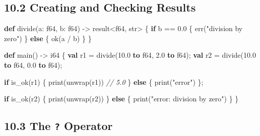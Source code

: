 \documentclass[
  english,
]{book}
\newenvironment{Shaded}{\begin{snugshade}}{\end{snugshade}}
\newcommand{\CommentTok}[1]{\textcolor[rgb]{0.42,0.60,0.33}{\textit{#1}}}
\newcommand{\ControlFlowTok}[1]{\textcolor[rgb]{0.77,0.53,0.75}{\textbf{#1}}}
\newcommand{\DataTypeTok}[1]{\textcolor[rgb]{0.31,0.79,0.69}{#1}}
\newcommand{\FloatTok}[1]{\textcolor[rgb]{0.71,0.81,0.66}{#1}}
\newcommand{\FunctionTok}[1]{\textcolor[rgb]{0.86,0.86,0.67}{#1}}
\newcommand{\KeywordTok}[1]{\textcolor[rgb]{0.34,0.61,0.84}{\textbf{#1}}}
\newcommand{\NormalTok}[1]{\textcolor[rgb]{0.83,0.83,0.83}{#1}}
\newcommand{\OperatorTok}[1]{\textcolor[rgb]{0.83,0.83,0.83}{#1}}
\newcommand{\StringTok}[1]{\textcolor[rgb]{0.81,0.57,0.47}{#1}}
\begin{document}
\subsection{10.2 Creating and Checking
Results}\label{creating-and-checking-results}

\begin{Shaded}
\begin{Highlighting}[]
\KeywordTok{def}\NormalTok{ divide(a: }\DataTypeTok{f64}\NormalTok{, b: }\DataTypeTok{f64}\NormalTok{) }\OperatorTok{{-}\textgreater{}} \DataTypeTok{result}\OperatorTok{\textless{}}\DataTypeTok{f64}\NormalTok{, }\DataTypeTok{str}\OperatorTok{\textgreater{}}\NormalTok{ \{}
    \ControlFlowTok{if}\NormalTok{ b }\OperatorTok{==} \FloatTok{0.0}\NormalTok{ \{}
        \FunctionTok{err}\NormalTok{(}\StringTok{"division by zero"}\NormalTok{)}
\NormalTok{    \} }\ControlFlowTok{else}\NormalTok{ \{}
        \FunctionTok{ok}\NormalTok{(a }\OperatorTok{/}\NormalTok{ b)}
\NormalTok{    \}}
\NormalTok{\}}

\KeywordTok{def}\NormalTok{ main() }\OperatorTok{{-}\textgreater{}} \DataTypeTok{i64}\NormalTok{ \{}
    \KeywordTok{val}\NormalTok{ r1 }\OperatorTok{=}\NormalTok{ divide(}\FloatTok{10.0} \KeywordTok{to} \DataTypeTok{f64}\NormalTok{, }\FloatTok{2.0} \KeywordTok{to} \DataTypeTok{f64}\NormalTok{);}
    \KeywordTok{val}\NormalTok{ r2 }\OperatorTok{=}\NormalTok{ divide(}\FloatTok{10.0} \KeywordTok{to} \DataTypeTok{f64}\NormalTok{, }\FloatTok{0.0} \KeywordTok{to} \DataTypeTok{f64}\NormalTok{);}

    \ControlFlowTok{if} \FunctionTok{is\_ok}\NormalTok{(r1) \{}
        \FunctionTok{print}\NormalTok{(unwrap(r1))     }\CommentTok{// 5.0}
\NormalTok{    \} }\ControlFlowTok{else}\NormalTok{ \{}
        \FunctionTok{print}\NormalTok{(}\StringTok{"error"}\NormalTok{)}
\NormalTok{    \};}

    \ControlFlowTok{if} \FunctionTok{is\_ok}\NormalTok{(r2) \{}
        \FunctionTok{print}\NormalTok{(unwrap(r2))}
\NormalTok{    \} }\ControlFlowTok{else}\NormalTok{ \{}
        \FunctionTok{print}\NormalTok{(}\StringTok{"error: division by zero"}\NormalTok{)}
\NormalTok{    \}}
\NormalTok{\}}
\end{Highlighting}
\end{Shaded}

\subsection{\texorpdfstring{10.3 The \texttt{?}
Operator}{10.3 The ? Operator}}\label{the-operator}
\end{document}
